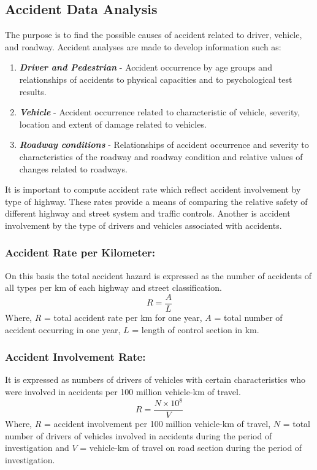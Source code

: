 \subsection{Accident Data Analysis}
The purpose is to find the possible causes of accident related to driver, vehicle, and roadway. Accident analyses are made to develop information such as:
\begin{enumerate}
	\item \textbf{\textit{Driver and Pedestrian}} - Accident occurrence by age groups and relationships of accidents to physical capacities and to psychological test results.
	\item \textbf{\textit{Vehicle}} - Accident occurrence related to characteristic of vehicle, severity, location and extent of damage related to vehicles.
	\item \textbf{\textit{Roadway conditions}} - Relationships of accident occurrence and severity to characteristics of the roadway and roadway condition and relative values of changes related to roadways.
\end{enumerate}
It is important to compute accident rate which reflect accident involvement by type of highway. These rates provide a means of comparing the relative safety of different highway and street system and traffic controls. Another is accident involvement by the type of drivers and vehicles associated with accidents.
\subsubsection{Accident Rate per Kilometer:}
On this basis the total accident hazard is expressed as the number of accidents of all types per km of each highway and street classification.
\begin{equation}
	R = \frac{A}{L}
\end{equation}
Where, $ R $ = total accident rate per km for one year, $ A $ = total number of accident occurring in one year, $ L $ = length of control section in km.
%
\subsubsection{Accident Involvement Rate:}
It is expressed as numbers of drivers of vehicles with certain characteristics who were involved in accidents per 100 million vehicle-km of travel.
\begin{equation}
	R = \frac{N \times 10^8}{V}
\end{equation}
Where, $ R $ = accident involvement per 100 million vehicle-km of travel, $ N $ = total number of drivers of vehicles involved in accidents during the period of investigation and $ V $ = vehicle-km of travel on road section during the period of investigation.
%
